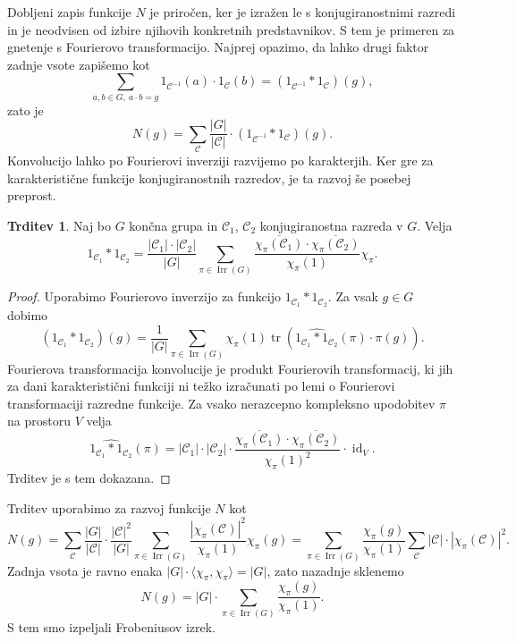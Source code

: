 \documentclass[11pt]{book}
\def\conclass{\mathcal{C}}
\DeclareMathOperator\tr{tr}
\DeclareMathOperator\Irr{Irr}
\DeclareMathOperator\id{id}
\theoremstyle{definition}
\theoremstyle{zgled}
\theoremstyle{zgledbrezstevilke}
\theoremstyle{odprtproblem}
\theoremstyle{domacanaloga}
\newenvironment{dokaz}
    {\color{siva}\begin{proof}}
    {\end{proof}}
\theoremstyle{izrek}
\newtheorem{trditev}[theorem]{Trditev}
\begin{document}
Dobljeni zapis funkcije $N$ je priročen, ker je izražen le s konjugiranostnimi razredi in je neodvisen od izbire njihovih konkretnih predstavnikov. S tem je primeren za gnetenje s Fourierovo transformacijo. Najprej opazimo, da lahko drugi faktor zadnje vsote zapišemo kot
\[
    \sum_{a,b \in G, \ a \cdot b = g} 1_{\conclass^{-1}}(a) \cdot 1_{\conclass}(b) = \left( 1_{\conclass^{-1}} * 1_{\conclass} \right) (g),
\]
zato je
\[
    N(g) = \sum_{\conclass} \frac{|G|}{|\conclass|} \cdot \left( 1_{\conclass^{-1}} * 1_{\conclass} \right) (g).
\]
Konvolucijo lahko po Fourierovi inverziji razvijemo po karakterjih. Ker gre za karakteristične funkcije konjugiranostnih razredov, je ta razvoj še posebej preprost.

\begin{trditev}
Naj bo $G$ končna grupa in $\conclass_1$, $\conclass_2$ konjugiranostna razreda v $G$. Velja
    \[
        1_{\conclass_1} * 1_{\conclass_2} = \frac{|\conclass_1| \cdot |\conclass_2|}{|G|} \sum_{\pi \in \Irr(G)} \frac{\overline{\chi_{\pi}(\conclass_1)} \cdot \overline{\chi_{\pi}(\conclass_2)}}{\chi_{\pi}(1)} \chi_{\pi}.
    \]
\end{trditev}
\begin{dokaz}
    Uporabimo Fourierovo inverzijo za funkcijo $1_{\conclass_1} * 1_{\conclass_2}$. Za vsak $g \in G$ dobimo
    \[
        \left( 1_{\conclass_1} * 1_{\conclass_2} \right) (g) 
        = \frac{1}{|G|} \sum_{\pi \in \Irr(G)} \chi_{\pi}(1) \tr \left( \widehat{1_{\conclass_1} * 1_{\conclass_2}}(\pi) \cdot \pi(g) \right).
    \]
    Fourierova transformacija konvolucije je produkt Fourierovih transformacij, ki jih za dani karakteristični funkciji ni težko izračunati po lemi o Fourierovi transformaciji razredne funkcije. Za vsako nerazcepno kompleksno upodobitev $\pi$ na prostoru $V$ velja
    \[
        \widehat{1_{\conclass_1} * 1_{\conclass_2}}(\pi) =
        |\conclass_1| \cdot |\conclass_2| \cdot \frac{\overline{\chi_{\pi}(\conclass_1)} \cdot \overline{\chi_{\pi}(\conclass_2)}}{\chi_{\pi}(1)^2} \cdot {\textstyle \id_V}.
    \]
    Trditev je s tem dokazana.
\end{dokaz}

Trditev uporabimo za razvoj funkcije $N$ kot
\[
    N(g) = \sum_{\conclass} \frac{|G|}{|\conclass|} \cdot \frac{|\conclass|^2}{|G|} \sum_{\pi \in \Irr(G)} \frac{|\chi_{\pi}(\conclass)|^2}{\chi_{\pi}(1)} \chi_{\pi}(g)
    = \sum_{\pi \in \Irr(G)} \frac{\chi_{\pi}(g)}{\chi_{\pi}(1)} \sum_{\conclass} |\conclass| \cdot |\chi_{\pi}(\conclass)|^2.
\]
Zadnja vsota je ravno enaka $|G| \cdot \langle \chi_{\pi}, \chi_{\pi} \rangle = |G|$, zato nazadnje sklenemo
\[
    N(g) = |G| \cdot \sum_{\pi \in \Irr(G)} \frac{\chi_{\pi}(g)}{\chi_{\pi}(1)}.
\]
S tem smo izpeljali Frobeniusov izrek.
\end{document}
